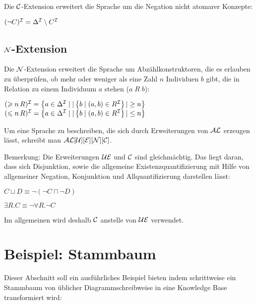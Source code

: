 \documentclass[runningheads,a4paper]{llncs}
\begin{document}
Die $\cal C$-Extension erweitert die Sprache um die Negation nicht atomarer  Konzepte:

	\begin{center}
	 $(\neg C)^{\cal I}=\Delta^{\cal I}\setminus C^{\cal I} $
	\end{center}



\subsection{$\cal N$-Extension}

Die $\cal N$-Extension erweitert die Sprache um Abzählkonstruktoren, die es erlauben zu überprüfen, ob mehr oder weniger als eine Zahl $n$ Individuen $b$ gibt, die in Relation zu einem Individuum $a$ stehen ($a\; R\; b$):

	\begin{center}
	$(\geqslant n\, R)^{\cal I}=\left\{a\in \Delta^{\cal I}\;|\; | \left\{ b\;|\;(a,b)\in R^{\cal I}\right\}| \geq n \right\} $ 
	$(\leqslant n\, R)^{\cal I}=\left\{a\in \Delta^{\cal I}\;|\; | \left\{ b\;|\;(a,b)\in R^{\cal I}\right\}| \leq n \right\} $ 
	\end{center}

\vspace{0.5cm}

Um eine Sprache zu beschreiben, die sich durch Erweiterungen von  $\cal AL$ erzeugen lässt, schreibt man $\cal AL[U][E][N][C]$.

Bemerkung: Die Erweiterungen $\cal UE$ und $\cal C$ sind gleichmächtig. Das liegt daran, dass sich Disjunktion, sowie die allgemeine Existenzquantifizierung mit Hilfe von allgemeiner Negation, Konjunktion und Allquantifizierung darstellen lässt:

	\begin{center}
		$C\sqcup D\equiv \neg(\neg C \sqcap \neg D)$ 

		$\exists R.C \equiv \neg \forall R.\neg C$
	\end{center}
 
Im allgemeinen wird deshalb $\cal C$ anstelle von $\cal UE$ verwendet.


\section{Beispiel: Stammbaum}

Dieser Abschnitt soll ein ausführliches Beispiel bieten indem schrittweise ein Stammbaum von üblicher Diagrammschreibweise in eine Knowledge Base transformiert wird:
\end{document}
